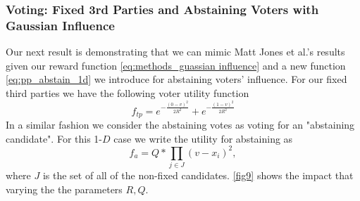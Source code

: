 \documentclass{article}
\begin{document}
        \subsubsection{Voting: Fixed 3rd Parties and Abstaining Voters with Gaussian Influence}
            Our next result is demonstrating that we can mimic Matt Jones et al.'s results given our reward function \cref{eq:methods_guassian influence} and a new function \cref{eq:pp_abstain_1d} we introduce for abstaining voters' influence. For our fixed third parties we have the following voter utility function 
            \begin{equation}
                f_{tp}=e^{-\frac{(0-v)^2}{2R^2}}+e^{-\frac{(1-v)^2}{2R^2}}
            \end{equation}
            In a similar fashion we consider the abstaining votes as voting for an "abstaining candidate". For this 1-$D$ case we write the utility for abstaining as
            \begin{equation}
                f_{a}=Q*\prod_{j\in J}(v-x_{i})^{2}, \label{eq:pp_abstain_1d}
            \end{equation}
            where $J$ is the set of all of the non-fixed candidates. 
            \cref{fig9} shows the impact that varying the the parameters $R,Q$.
\end{document}

